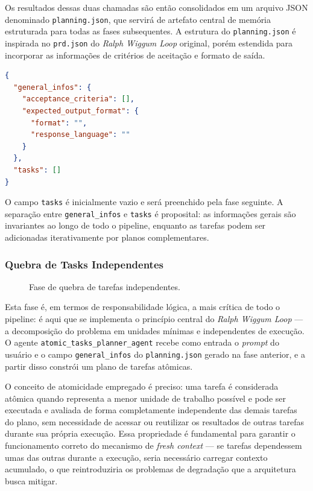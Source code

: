 \documentclass[a4paper,10pt,twocolumn]{article}
\begin{document}
Os resultados dessas duas chamadas são então consolidados em um arquivo JSON denominado \texttt{planning.json}, que servirá de artefato central de memória estruturada para todas as fases subsequentes. A estrutura do \texttt{planning.json} é inspirada no \texttt{prd.json} do \textit{Ralph Wiggum Loop} original, porém estendida para incorporar as informações de critérios de aceitação e formato de saída.

\begin{lstlisting}[language=json]
{
  "general_infos": {
    "acceptance_criteria": [],
    "expected_output_format": {
      "format": "",
      "response_language": ""
    }
  },
  "tasks": []
}
\end{lstlisting}

O campo \texttt{tasks} é inicialmente vazio e será preenchido pela fase seguinte. A separação entre \texttt{general\_infos} e \texttt{tasks} é proposital: as informações gerais são invariantes ao longo de todo o pipeline, enquanto as tarefas podem ser adicionadas iterativamente por planos complementares.

\subsubsection{Quebra de Tasks Independentes}

\begin{figure}[H]
  \centering
  
  \caption{Fase de quebra de tarefas independentes.}
  \label{fig:quebra_tasks}
\end{figure}

Esta fase é, em termos de responsabilidade lógica, a mais crítica de todo o pipeline: é aqui que se implementa o princípio central do \textit{Ralph Wiggum Loop} — a decomposição do problema em unidades mínimas e independentes de execução. O agente \texttt{atomic\_tasks\_planner\_agent} recebe como entrada o \textit{prompt} do usuário e o campo \texttt{general\_infos} do \texttt{planning.json} gerado na fase anterior, e a partir disso constrói um plano de tarefas atômicas.

O conceito de atomicidade empregado é preciso: uma tarefa é considerada atômica quando representa a menor unidade de trabalho possível e pode ser executada e avaliada de forma completamente independente das demais tarefas do plano, sem necessidade de acessar ou reutilizar os resultados de outras tarefas durante sua própria execução. Essa propriedade é fundamental para garantir o funcionamento correto do mecanismo de \textit{fresh context} — se tarefas dependessem umas das outras durante a execução, seria necessário carregar contexto acumulado, o que reintroduziria os problemas de degradação que a arquitetura busca mitigar.
\end{document}
